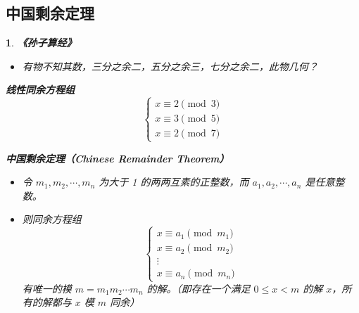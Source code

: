 \documentclass[UTF8]{report}
\theoremstyle{MyLineTheoremStyle} %
\theoremstyle{MyBlockTheoremStyle} %
\theoremstyle{MySubsubsectionStyle} %
\newtheorem{definition}{}
\begin{document}
\subsection{中国剩余定理}

\begin{definition}
    \textbf{《孙子算经》}
    \begin{itemize}
        \item 有物不知其数，三分之余二，五分之余三，七分之余二，此物几何？
    \end{itemize}

    \textbf{线性同余方程组}
    \[
    \begin{cases}
        x \equiv 2 \pmod{3} \\
        x \equiv 3 \pmod{5} \\
        x \equiv 2 \pmod{7}
    \end{cases}
    \]

    \textbf{中国剩余定理（Chinese Remainder Theorem）}
    \begin{itemize}
        \item 令 $m_1, m_2, \cdots, m_n$ 为大于 1 的两两互素的正整数，而 $a_1, a_2, \cdots, a_n$ 是任意整数。
        \item 则同余方程组
        \[
        \begin{cases}
            x \equiv a_1 \pmod{m_1} \\
            x \equiv a_2 \pmod{m_2} \\
            \vdots \\
            x \equiv a_n \pmod{m_n}
        \end{cases}
        \]
        有唯一的模 $m = m_1m_2 \cdots m_n$ 的解。（即存在一个满足 $0 \leq x < m$ 的解 $x$，所有的解都与 $x$ 模 $m$ 同余）
    \end{itemize}


\end{definition}
\end{document}
